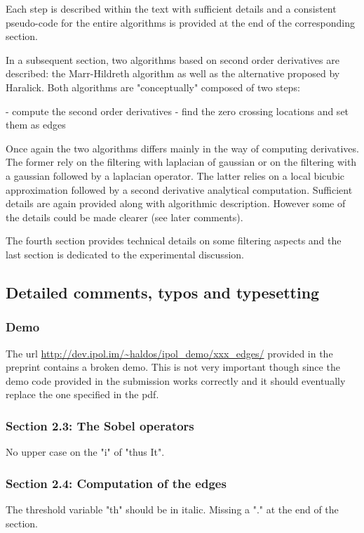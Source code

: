 \documentclass[a4paper,10pt]{report}
\begin{document}
Each step is described within the text with sufficient details and a consistent
pseudo-code for the entire algorithms is provided at the end of the
corresponding section.

In a subsequent section, two algorithms based on second order derivatives are
described: the Marr-Hildreth algorithm as well as the alternative proposed by
Haralick. Both algorithms are "conceptually" composed of two steps:

- compute the second order derivatives
- find the zero crossing locations and set them as edges

Once again the two algorithms differs mainly in the way of computing
derivatives. The former rely on the filtering with laplacian of gaussian or on
the filtering with a gaussian followed by a laplacian operator. The latter
relies on a local bicubic approximation followed by a second derivative
analytical computation. Sufficient details are again provided along with
algorithmic description. However some of the details could be made clearer (see
later comments).

The fourth section provides technical details on some filtering aspects and the
last section is dedicated to the experimental discussion.


\subsection{Detailed comments, typos and typesetting}
\subsubsection{Demo}
The url \url{http://dev.ipol.im/~haldos/ipol_demo/xxx_edges/} provided in the preprint
contains a broken demo. This is not very important though since the demo code
provided in the submission works correctly and it should eventually replace the
one specified in the pdf.


\subsubsection{ Section 2.3: The Sobel operators}
No upper case on the "i" of "thus It".


\subsubsection{Section 2.4: Computation of the edges}
The threshold variable "th" should be in italic.
Missing a "." at the end of the section.
\end{document}

